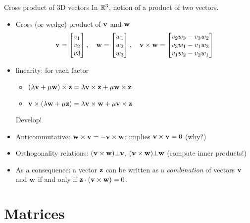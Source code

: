 \documentclass[8pt,dvipsnames]{beamer}
\begin{document}
\begin{frame}{Cross product of 3D vectors}
  In ${\mathbb R}^3$, notion of a product of two vectors.
  \begin{itemize}[<+->]
  \item Cross (or wedge) product of ${\bf v}$ and ${\bf w}$
    $$
    {\bf v} =
    \begin{bmatrix}
      v_1\\v_2\\v3
    \end{bmatrix},\quad {\bf w} = 
    \begin{bmatrix}
      w_1\\w_2 \\ w_3
    \end{bmatrix},\quad
    {\bf v}\times {\bf w} =
    \begin{bmatrix}
      v_2 w_3 - v_3 w_2\\
      v_3 w_1 - v_1 w_3\\
      v_1 w_2 - v_2 w_1
    \end{bmatrix}
    $$\vfill
  \item linearity: for each factor
    \begin{itemize}
    \item $(\lambda{\bf v} + \mu{\bf w})\times {\bf z} = \lambda{\bf v}\times {\bf z} + \mu{\bf w}\times {\bf z}$
    \item ${\bf v} \times(\lambda{\bf w} + \mu{\bf z}) = \lambda{\bf v}\times {\bf w} + \mu{\bf v}\times {\bf z}$
    \end{itemize}
    \pause Develop!\vfill
  \item Anticommutative: ${\bf w}\times {\bf v} = -{\bf v}\times{\bf w}$: implies ${\bf v}\times {\bf v} = 0$ (why?)\vfill
  \item Orthogonality relations: $({\bf v}\times{\bf w}) \bot {\bf v}$, $({\bf v}\times{\bf w}) \bot{\bf w}$ (compute inner products!)\vfill
  \item As a consequence: a vector ${\bf z}$ can be written as a \emph{combination} of vectors ${\bf v}$ and ${\bf w}$ if and only if ${\bf z}\cdot({\bf v}\times{\bf w}) = 0$.
  \end{itemize}
\end{frame}



\section{Matrices}
\end{document}

